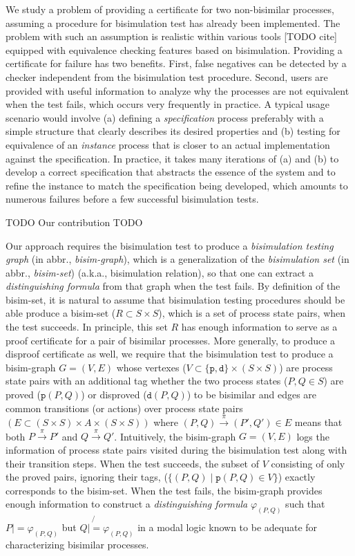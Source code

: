 \documentclass{llncs}
\begin{document}
We study a problem of providing a certificate for two non-bisimilar processes,
assuming a procedure for bisimulation test has already been implemented.
The problem with such an assumption is realistic within various tools [TODO cite]
equipped with equivalence checking features based on bisimulation.
Providing a certificate for failure has two benefits. First, false negatives
can be detected by a checker independent from the bisimulation test procedure.
Second, users are provided with useful information to analyze why
the processes are not equivalent when the test fails, which occurs very
frequently in practice. A typical usage scenario would involve
(a) defining a \emph{specification} process preferably with a simple structure
    that clearly describes its desired properties and
(b) testing for equivalence of an \emph{instance} process that is closer to
    an actual implementation against the specification.
In practice, it takes many iterations of (a) and (b) to develop a correct
specification that abstracts the essence of the system and to refine
the instance to match the specification being developed, which amounts to
numerous failures before a few successful bisimulation tests.

TODO Our contribution TODO

Our approach requires the bisimulation test to produce
a \emph{bisimulation testing graph} (in abbr., \emph{bisim-graph}),
which is a generalization of the \emph{bisimulation set}
(in abbr., \emph{bisim-set}) (a.k.a., bisimulation relation),
so that one can extract a \emph{distinguishing formula} from that graph
when the test fails.
By definition of the bisim-set, it is natural to assume that bisimulation
testing procedures should be able produce a bisim-set ($R \subset S\times S$),
which is a set of process state pairs, when the test succeeds.
In principle, this set $R$ has enough information to serve as a proof
certificate for a pair of bisimilar processes. More generally, to produce
a disproof certificate as well, we require that the bisimulation test
to produce a bisim-graph $G=(V,E)$ whose vertexes
($V\subset\{\texttt{p},\texttt{d}\}\times(S\times S)$) are process state pairs
with an additional tag whether the two process states ($P, Q\in S$) are proved
($\texttt{p}(P,Q)$) or disproved ($\texttt{d}(P,Q)$) to be bisimilar and edges
are common transitions (or actions) over process state pairs
$(E\subset(S\times S)\times A\times(S\times S))$ where
$(P,Q)\xrightarrow{\pi}(P',Q') \in E$ means that both $P\xrightarrow{\pi}P'$
and $Q\xrightarrow{\pi}Q'$. Intuitively, the bisim-graph $G=(V,E)$ logs
the information of process state pairs visited during the bisimulation test
along with their transition steps. When the test succeeds,
the subset of $V$ consisting of only the proved pairs, ignoring their tags,
($\{(P,Q) \mid \texttt{p}(P,Q)\in V\}$) exactly corresponds to the bisim-set.
When the test fails, the bisim-graph provides enough information to
construct a \emph{distinguishing formula} $\varphi_{(P,Q)}$ such that
$P |= \varphi_{(P,Q)}$ but $Q \not{|=} \varphi_{(P,Q)}$ in a modal logic
known to be adequate for characterizing bisimilar processes.
\end{document}
